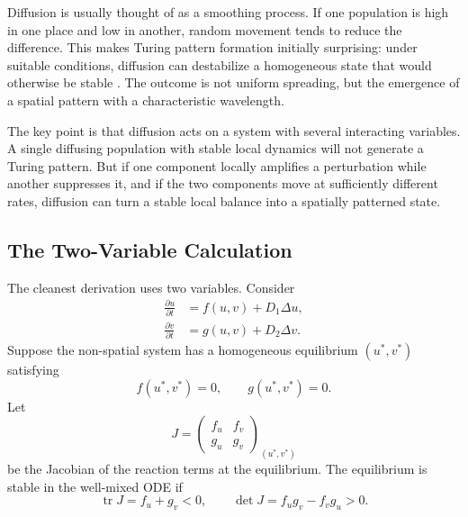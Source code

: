 \documentclass[12pt,letterpaper]{article}
\numberwithin{equation}{section}
\begin{document}
Diffusion is usually thought of as a smoothing process. If one population is high in
one place and low in another, random movement tends to reduce the difference. This
makes Turing pattern formation initially surprising: under suitable conditions,
diffusion can destabilize a homogeneous state that would otherwise be stable
\cite{turing1952,murray2002}. The outcome is not uniform spreading, but the emergence of a
spatial pattern with a characteristic wavelength.

The key point is that diffusion acts on a system with several interacting variables. A
single diffusing population with stable local dynamics will not generate a Turing
pattern. But if one component locally amplifies a perturbation while another suppresses
it, and if the two components move at sufficiently different rates, diffusion can turn a
stable local balance into a spatially patterned state.

\subsection{The Two-Variable Calculation}

The cleanest derivation uses two variables. Consider
\begin{align}
    \frac{\partial u}{\partial t}
    &= f(u,v)+D_1\Delta u,\\
    \frac{\partial v}{\partial t}
    &= g(u,v)+D_2\Delta v.
\end{align}
Suppose the non-spatial system has a homogeneous equilibrium
$(u^*,v^*)$ satisfying
\begin{equation}
    f(u^*,v^*)=0,
    \qquad
    g(u^*,v^*)=0.
\end{equation}
Let
\begin{equation}
    J=
    \begin{pmatrix}
        f_u & f_v\\
        g_u & g_v
    \end{pmatrix}_{(u^*,v^*)}
\end{equation}
be the Jacobian of the reaction terms at the equilibrium. The equilibrium is stable in
the well-mixed ODE if
\begin{equation}
    \operatorname{tr}J=f_u+g_v<0,
    \qquad
    \det J=f_ug_v-f_vg_u>0.
\end{equation}
\end{document}
